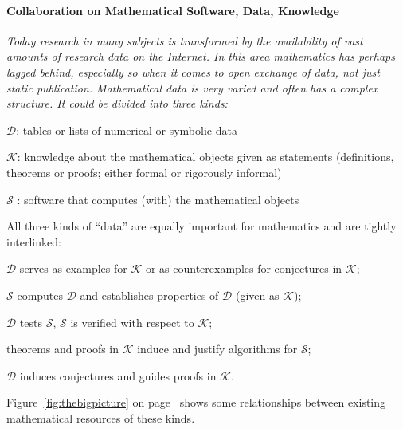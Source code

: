 \paragraph{Collaboration on Mathematical Software, Data,
  Knowledge}%

\begin{center}
\begin{boxedminipage}{.95\textwidth}\em
Today research in many subjects is transformed by the availability of
vast amounts of research data on the Internet. In this area
mathematics has perhaps lagged behind, especially so when it comes to
open exchange of data, not just static publication.  Mathematical data
is very varied and often has a complex structure. It could be divided into
three kinds:
\begin{compactitem}
\item $\mathcal{D}$: tables or lists of numerical or symbolic data
\item $\mathcal{K}$: knowledge about the mathematical objects given as statements
  (definitions, theorems or proofs; either formal or rigorously informal)
\item $\mathcal{S}$ : software that computes (with) the mathematical objects
\end{compactitem}

All three kinds of ``data'' are equally important for mathematics and are tightly
interlinked:
\begin{compactitem}
\item $\mathcal{D}$ serves as examples for $\mathcal{K}$ or as counterexamples for
  conjectures in $\mathcal{K}$;
\item $\mathcal{S}$ computes $\mathcal{D}$ and establishes properties of $\mathcal{D}$
  (given as $\mathcal{K}$);
\item $\mathcal{D}$ tests $\mathcal{S}$, $\mathcal{S}$ is verified with respect to
  $\mathcal{K}$;
\item theorems and proofs in $\mathcal{K}$ induce and justify algorithms for
  $\mathcal{S}$;
\item $\mathcal{D}$ induces conjectures and guides proofs in $\mathcal{K}$.
\end{compactitem}
\end{boxedminipage}
\end{center}
Figure~\ref{fig:thebigpicture} on
page~\pageref{fig:thebigpicture} shows some relationships between
existing mathematical resources of these kinds.

